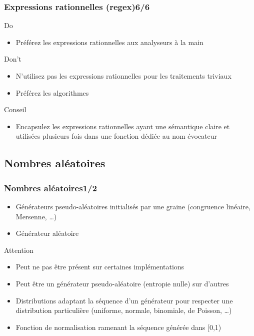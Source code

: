 \documentclass[C++.tex]{subfiles}
\begin{document}
\begin{frame}[fragile]
	\frametitle{Expressions rationnelles (regex)\titlehfill{}6/6}
	\begin{exampleblock}{Do}
		\begin{itemize}
			\item Préférez les expressions rationnelles aux analyseurs \og à la main\fg{}
		\end{itemize}
	\end{exampleblock}

	\begin{alertblock}{Don't}
		\begin{itemize}
			\item N'utilisez pas les expressions rationnelles pour les traitements triviaux
			\item Préférez les algorithmes
		\end{itemize}

 		\end{alertblock}

	\begin{block}{Conseil}
		\begin{itemize}
			\item Encapsulez les expressions rationnelles ayant une sémantique claire et utilisées plusieurs fois dans une fonction dédiée au nom évocateur
		\end{itemize}
	\end{block}
\end{frame}

\subsection*{Nombres aléatoires}
\begin{frame}[fragile]
	\frametitle{Nombres aléatoires\titlehfill{}1/2}
	\begin{itemize}
		\item Générateurs pseudo-aléatoires initialisés par une graine (congruence linéaire, Mersenne, \ldots)
		\item Générateur aléatoire
	\end{itemize}

	\begin{alertblock}{Attention}
		\begin{itemize}
			\item Peut ne pas être présent sur certaines implémentations
			\item Peut être un générateur pseudo-aléatoire (entropie nulle) sur d'autres
		\end{itemize}
	\end{alertblock}

	\begin{itemize}
		\item Distributions adaptant la séquence d'un générateur pour respecter une distribution particulière (uniforme, normale, binomiale, de Poisson, \ldots)
		\item Fonction de normalisation ramenant la séquence générée dans [0,1)
	\end{itemize}
\end{frame}
\end{document}
